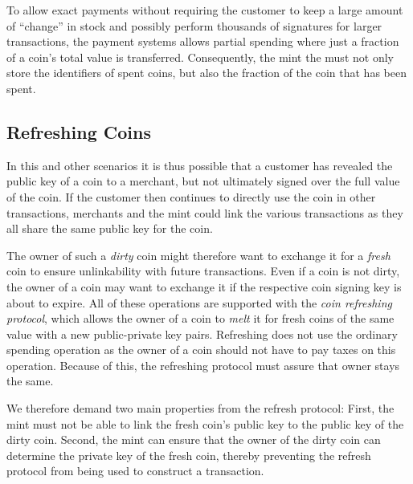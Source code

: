 \documentclass{llncs}
\begin{document}
To allow exact payments without requiring the customer to keep a large
amount of ``change'' in stock and possibly perform thousands of
signatures for larger transactions, the payment systems allows partial
spending where just a fraction of a coin's total value is transferred.
Consequently, the mint the must not only store the identifiers of
spent coins, but also the fraction of the coin that has been spent.


\subsection{Refreshing Coins}

In this and other scenarios it is thus possible that a customer has
revealed the public key of a coin to a merchant, but not ultimately
signed over the full value of the coin.  If the customer then
continues to directly use the coin in other transactions, merchants
and the mint could link the various transactions as they all share the
same public key for the coin.

The owner of such a {\em dirty} coin might therefore want to exchange it
for a {\em fresh} coin to ensure unlinkability with future transactions.
Even if a coin is not dirty, the owner of a coin may want to exchange it
if the respective coin signing key is about to expire.  All of these
operations are supported with the {\em coin refreshing protocol}, which
allows the owner of a coin to {\em melt} it for fresh coins of the same
value with a new public-private key pairs.  Refreshing does not use the
ordinary spending operation as the owner of a coin should not have to
pay taxes on this operation.  Because of this, the refreshing protocol
must assure that owner stays the same.

We therefore demand two main properties from the refresh protocol:
First, the mint must not be able to link the fresh coin's public key to
the public key of the dirty coin.  Second, the mint can ensure that the
owner of the dirty coin can determine the private key of the
fresh coin, thereby preventing the refresh protocol from being used to
construct a transaction.

%
\end{document}
